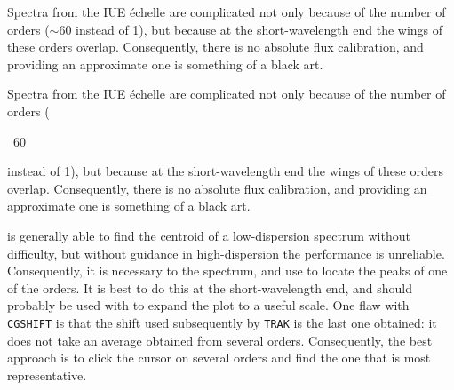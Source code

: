 \begin{latexonly}
Spectra from the IUE \'{e}chelle are complicated not only because of the number
of orders ($\sim 60$ instead of 1), but because at the short-wavelength end
the wings of these orders overlap. Consequently, there is no absolute flux
calibration, and providing an approximate one is something of a black art.
\end{latexonly}

\begin{htmlonly}
Spectra from the IUE \'{e}chelle are complicated not only because of the number
of orders (\begin{rawhtml}~60\end{rawhtml} instead of 1), but because at the
short-wavelength end the wings of these orders overlap. Consequently, there is
no absolute flux calibration, and providing an approximate one is something of
a black art.
\end{htmlonly}

 is generally able to find the centroid of a
low-dispersion
spectrum without difficulty, but without guidance in high-dispersion the
performance is unreliable.  Consequently, it is necessary to
 the
spectrum, and use  to locate the peaks of
one of the orders.
It is best to do this at the short-wavelength end, and
 should probably be used with
 to expand the plot to a useful scale.
One flaw with \verb+CGSHIFT+ is that the shift used subsequently by \verb+TRAK+
is the last one obtained: it does not take an average obtained from several
orders.  Consequently, the best approach is to click the cursor on several
orders and find the one that is most representative.

